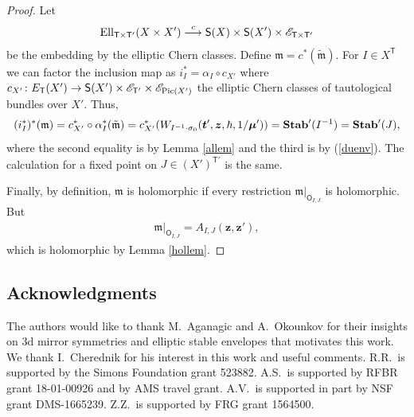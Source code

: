 \documentclass[10pt,a4paper]{amsart}
\newcommand{\bT}{\mathsf{T}}
\newcommand{\Or}{\textsf{O}}
\newcommand{\cE}{\mathscr{E}}
\def\ttt{{\boldsymbol t}}
\def\zz{{\boldsymbol z}}
\def\mub{{\boldsymbol\mu}}
\numberwithin{equation}{section}
\begin{document}
\begin{proof} Let
 \begin{gather*}
 {\rm Ell}_{\bT\times\bT'}(X\times X' )\stackrel{c}{\longrightarrow} \textsf{S}(X)\times \textsf{S}(X') \times \cE_{\bT\times \bT'}
 \end{gather*}
 be the embedding by the elliptic Chern classes. Define ${\mathfrak{m}}=c^{*}(\tilde{{\mathfrak{m}}})$.
 For $I\in X^{\bT}$ we can factor the inclusion map as $i^{*}_{I}=\alpha_{I}\circ c_{X'}$ where
 $ c_{X'}\colon E_{\bT}(X') \rightarrow \mathsf{S}(X')\times \cE_{\bT'}\times \cE_{{\rm Pic}(X')} $
 the elliptic Chern classes of tautological bundles over $X'$. Thus,
 \begin{gather*}
 (i^{*}_{I})^{*}(\mathfrak{m})=c_{X'}^{*} \circ \alpha^{*}_{I} (\tilde{\mathfrak{m}}) = c_{X'}^{*} (W_{I^{-1}\cdot \sigma_0}(\ttt',\zz,\hbar,1/\mub'))={\bf Stab}'(I^{-1})={\bf Stab}'(J),
 \end{gather*}
 where the second equality is by Lemma \ref{allem} and the third is by (\ref{duenv}). The calculation for a fixed point on $J \in (X')^{\bT'}$ is the same.

 Finally, by definition, ${\mathfrak{m}}$ is holomorphic if every restriction $ {\mathfrak{m}} |_{\Or_{I,J}}$ is holomorphic. But
 \begin{gather*}
 {\mathfrak{m}} |_{\Or_{I,J}}=A_{I,J}(\zz,\zz'),
 \end{gather*}
 which is holomorphic by Lemma \ref{hollem}.
\end{proof}


\subsection*{Acknowledgments}

The authors would like to thank M.~Aganagic and A.~Okounkov for their insights on 3d mirror symmetries and elliptic stable envelopes that motivates this work. We thank I.~Cherednik for his interest in this work and useful comments. R.R.~is supported by the Simons Foundation grant 523882. A.S.~is supported by RFBR grant 18-01-00926 and by AMS travel grant. A.V.~is supported in part by NSF grant DMS-1665239. Z.Z.~is supported by FRG grant 1564500.

\end{document}
